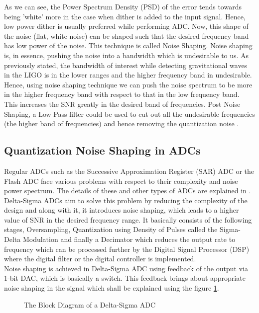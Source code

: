 \documentclass[colorlinks=true,pdfstartview=FitV,linkcolor=blue,
            citecolor=red,urlcolor=magenta]{ligodoc}
\begin{document}
As we can see, the Power Spectrum Density (PSD) of the error tends towards being 'white' more in the case when dither is added to the input signal.
Hence, low power dither is usually preferred while performing ADC.
Now, this shape of the noise (flat, white noise) can be shaped such that the desired frequency band has low power of the noise. This technique is called Noise Shaping.
 Noise shaping is, in essence, pushing the noise into a bandwidth which is undesirable to us. As previously stated, the bandwidth of interest while detecting gravitational waves in the LIGO is in the lower ranges and the higher frequency band in undesirable. Hence, using noise shaping technique we can push the noise spectrum to be more in the higher frequency band with respect to that in the low frequency band. This increases the SNR greatly in the desired band of frequencies.  Post Noise Shaping, a Low Pass filter could be used to cut out all the undesirable frequencies (the higher band of frequencies) and hence removing the quantization noise \cite{Basic_Sigma}.
 
 \subsection{Quantization Noise Shaping in ADCs}
 Regular ADCs such as the Successive Approximation Register (SAR) ADC or the Flash ADC face various problems with respect to their complexity and noise power spectrum. The details of these and other types of ADCs are explained in \cite{Oppenheim}.\\
 Delta-Sigma ADCs aim to solve this problem by reducing the complexity of the design and along with it, it introduces noise shaping, which leads to a higher value of SNR in the desired frequency range. It basically consists of the following stages, Oversampling, Quantization using Density of Pulses called the Sigma-Delta Modulation and finally a Decimator which reduces the output rate to frequency which can be processed further by the Digital Signal Processor (DSP) where the digital filter or the digital controller is implemented. \\
 Noise shaping is achieved in Delta-Sigma ADC using feedback of the output via 1-bit DAC, which is basically a switch. This feedback brings about appropriate noise shaping in the signal which shall be explained using the figure \ref{block2}.
 
 \begin{figure}[htbp]
 
  \centering
  
  \caption{The Block Diagram of a Delta-Sigma ADC}
 \label{block2}
\end{figure}
\end{document}
